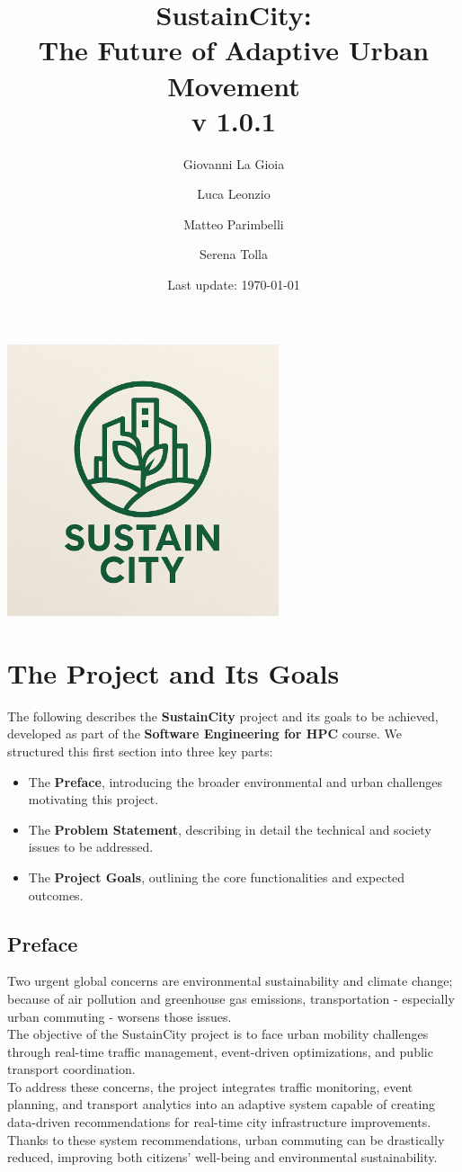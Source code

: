 \documentclass[a4paper,12pt]{article}
\title{SustainCity: \\ The Future of Adaptive Urban Movement \\ v 1.0.1}
\author[1]{Giovanni La Gioia}
\author[2]{Luca Leonzio}
\author[3]{Matteo Parimbelli}
\author[4]{Serena Tolla}
\affil[1,2,3,4]{Politecnico di Milano}
\date{Last update: \today}
\begin{document}
\maketitle
\vspace{2cm}
\centering
\includegraphics[width=0.6\textwidth]{diagrams/SustainCity_logo.png}
\newpage
\tableofcontents
\clearpage
\newpage

\section{The Project and Its Goals}
The following describes the \textbf{SustainCity} project and its goals to be achieved, developed as part of the \textbf{Software Engineering for HPC} course. We structured this first section into three key parts:
\begin{itemize}
    \item The \textbf{Preface}, introducing the broader environmental and urban challenges motivating this project.
    \item The \textbf{Problem Statement}, describing in detail the technical and society issues to be addressed.
    \item The \textbf{Project Goals}, outlining the core functionalities and expected outcomes.
\end{itemize}

\subsection*{Preface}
Two urgent global concerns are environmental sustainability and climate change; because of air pollution and greenhouse gas emissions, transportation - especially urban commuting - worsens those issues. 
\\ The objective of the SustainCity project is to face urban mobility challenges through real-time traffic management, event-driven optimizations, and public transport coordination. 
\\ To address these concerns, the project integrates traffic monitoring, event planning, and transport analytics into an adaptive system capable of creating data-driven recommendations for real-time city infrastructure improvements. 
\\ Thanks to these system recommendations, urban commuting can be drastically reduced, improving both citizens’ well-being and environmental sustainability.
\end{document}

